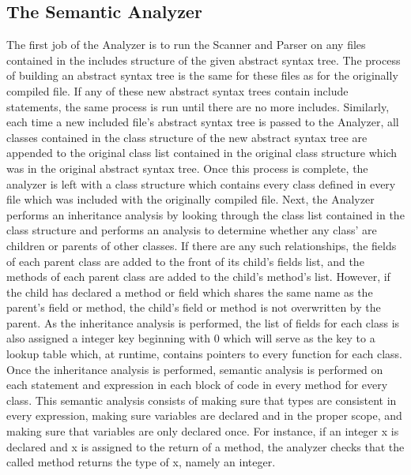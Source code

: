 \begin{homeworkProblem}
	\subsection{The Semantic Analyzer}
	The first job of the Analyzer is to run the Scanner and Parser on any files contained in the includes structure of the given abstract syntax tree. The process of building an abstract syntax tree is the same for these files as for the originally compiled file. If any of these new abstract syntax trees contain include statements, the same process is run until there are no more includes. Similarly, each time a new included file's abstract syntax tree is passed to the Analyzer, all classes contained in the class structure of the new abstract syntax tree are appended to the original class list contained in the original class structure which was in the original abstract syntax tree. Once this process is complete, the analyzer is left with a class structure which contains every class defined in every file which was included with the originally compiled file.
	Next, the Analyzer performs an inheritance analysis by looking through the class list contained in the class structure and performs an analysis to determine whether any class' are children or parents of other classes. If there are any such relationships, the fields of each parent class are added to the front of its child's fields list, and the methods of each parent class are added to the child's method's list. However, if the child has declared a method or field which shares the same name as the parent's field or method, the child's field or method is not overwritten by the parent. As the inheritance analysis is performed, the list of fields for each class is also assigned a integer key beginning with 0 which will serve as the key to a lookup table which, at runtime, contains pointers to every function for each class.
	Once the inheritance analysis is performed, semantic analysis is performed on each statement and expression in each block of code in every method for every class. This semantic analysis consists of making sure that types are consistent in every expression, making sure variables are declared and in the proper scope, and making sure that variables are only declared once. For instance, if an integer x is declared and x is assigned to the return of a method, the analyzer checks that the called method returns the type of x, namely an integer.

\end{homeworkProblem}
